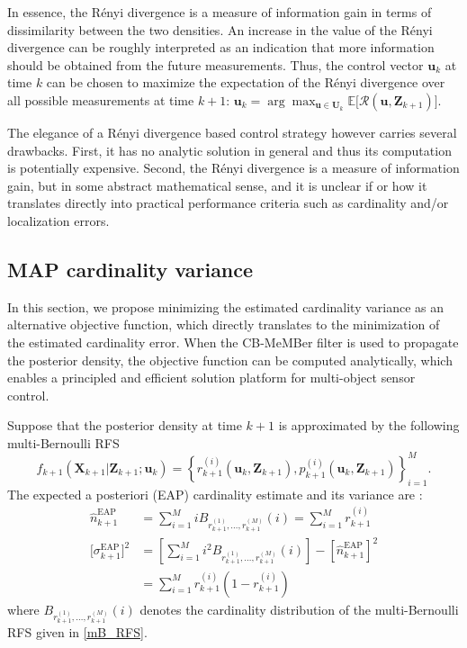 \documentclass[twocolumn]{autart}
\begin{document}
In essence, the R\'{e}nyi divergence is a measure of information gain in
terms of dissimilarity between the two densities. An increase in the value
of the R\'{e}nyi divergence can be roughly interpreted as an indication that
more information should be obtained from the future measurements. Thus, the
control vector $\mathbf{u}_{k}$ at time $k$ can be chosen to maximize the
expectation of the R\'{e}nyi divergence over all possible measurements at
time $k+1$: $\displaystyle \mathbf{u}_{k}=\arg \max_{\mathbf{u}\in \mathbf{U}_{k}}\mathbb{E}\big[\mathcal{R}(\mathbf{u},\mathbf{Z}_{k+1})\big]$.

The elegance of a R\'{e}nyi divergence based control strategy however
carries several drawbacks. First, it has no analytic solution in general
and thus its computation is potentially expensive. Second, the R\'{e}nyi
divergence is a measure of information gain, but in some abstract
mathematical sense, and it is unclear if or how it translates directly into
practical performance criteria such as cardinality and/or localization
errors.

\subsection{MAP cardinality variance}

In this section, we propose minimizing the estimated cardinality
variance as an alternative objective function, which directly translates to the
minimization of the estimated cardinality error. When the CB-MeMBer filter
is used to propagate the posterior density, the objective function can be
computed analytically, which enables a principled and efficient solution
platform for multi-object sensor control.

Suppose that the posterior density at time $k+1$ is approximated by the
following multi-Bernoulli RFS
\begin{equation}
f_{k+1}(\mathbf{X}_{k+1}|\mathbf{Z}_{k+1};\mathbf{u}_{k})=\left\{
r_{k+1}^{(i)}(\mathbf{u}_{k},\mathbf{Z}_{k+1}),p_{k+1}^{(i)}(\mathbf{u}_{k},\mathbf{Z}_{k+1})\right\} _{i=1}^{M}.  \label{mB_RFS}
\end{equation}The expected a posteriori (EAP) cardinality estimate and its variance are
\cite{Mah07}:
\begin{align}
\hat{n}_{k+1}^{\text{EAP}}& =\sum_{i=1}^{M}iB_{r_{k+1}^{(1)},\ldots
,r_{k+1}^{(M)}}(i)=\sum_{i=1}^{M}r_{k+1}^{(i)} \label{EAP_card}\\
\big[\sigma _{k+1}^{\text{EAP}}\big]^{2}& =\left[
\sum_{i=1}^{M}i^{2}B_{r_{k+1}^{(1)},\ldots ,r_{k+1}^{(M)}}(i)\right] -\left[
\hat{n}_{k+1}^{\text{EAP}}\right] ^{2}\label{EAP_var}\\
&=\sum_{i=1}^{M}r_{k+1}^{(i)}\left(
1-r_{k+1}^{(i)}\right)
\end{align}where $B_{r_{k+1}^{(1)},\ldots ,r_{k+1}^{(M)}}(i)$ denotes the cardinality
distribution of the multi-Bernoulli RFS given in \eqref{mB_RFS}.
\end{document}
